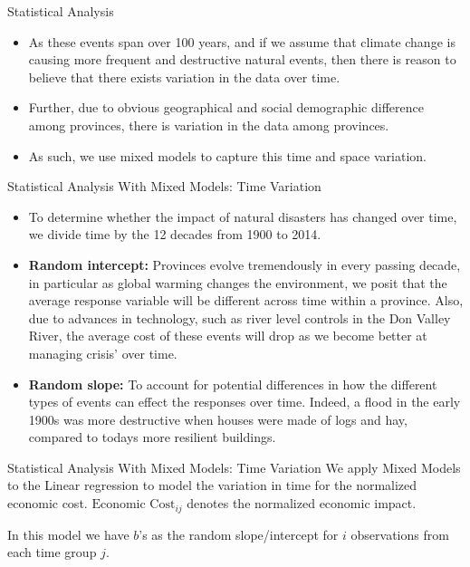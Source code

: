 \begin{frame}{Statistical Analysis}
\begin{itemize}
	\item As these events span over 100 years, and if we assume that climate change is causing more frequent and destructive natural events, then there is reason to believe that there exists variation in the data over time.
	\item Further, due to obvious geographical and social demographic difference among provinces, there is variation in the data among provinces. 
	\item As such, we use mixed models to capture this time and space variation.

\end{itemize}

\end{frame}
\begin{frame}{Statistical Analysis With Mixed Models: Time Variation}
	\begin{itemize}
		\item To determine whether the impact of natural disasters has changed over time, we divide time by the 12 decades from 1900 to 2014.
		\item \textbf{Random intercept: }Provinces evolve tremendously in every passing decade, in particular as global warming changes the environment, we posit that the average response variable will be different across time within a province. Also, due to advances in technology, such as river level controls in the Don Valley River, the average cost of these events will drop as we become better at managing crisis' over time.
		\item \textbf{Random slope: }To account for potential differences in how the different types of events can effect the responses over time. Indeed, a flood in the early 1900s was more destructive when houses were made of logs and hay, compared to todays more resilient buildings. 
	\end{itemize}
\end{frame}

\begin{frame}{Statistical Analysis With Mixed Models: Time Variation}
We apply Mixed Models to the Linear regression to model the variation in time for the normalized economic cost. $\text{Economic Cost}_{ij}$ denotes the normalized economic impact.

In this model we have $b$'s as the random slope/intercept for $i$ observations from each time group $j$.
\end{frame}

